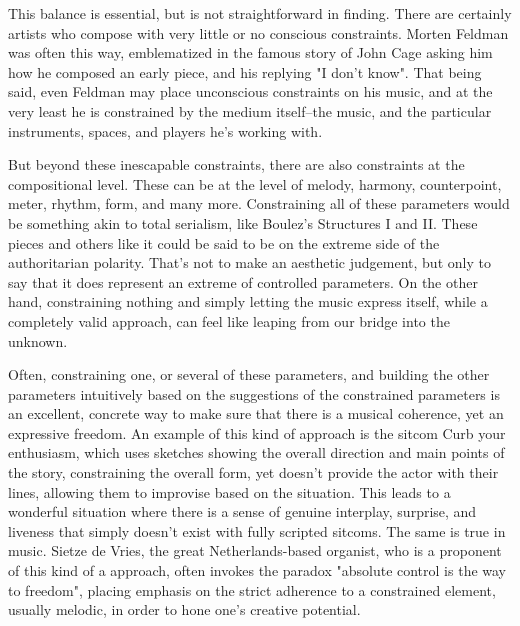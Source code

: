 \documentclass[12pt,twoside,maitrise]{dms}
\theoremstyle{definition}
\begin{document}
This balance is essential, but is not straightforward in finding.
There are certainly artists who compose with very little or no conscious constraints.
Morten Feldman was often this way, emblematized in the famous story of John Cage asking him how he composed an early piece, and his replying "I don't know".
That being said, even Feldman may place unconscious constraints on his music, and at the very least he is constrained by the medium itself--the music, and the particular instruments, spaces, and players he's working with.

But beyond these inescapable constraints, there are also constraints at the compositional level.
These can be at the level of melody, harmony, counterpoint, meter, rhythm, form, and many more.
Constraining all of these parameters would be something akin to total serialism, like Boulez's Structures I and II.
These pieces and others like it could be said to be on the extreme side of the authoritarian polarity.
That's not to make an aesthetic judgement, but only to say that it does represent an extreme of controlled parameters.
On the other hand, constraining nothing and simply letting the music express itself, while a completely valid approach, can feel like leaping from our bridge into the unknown.

Often, constraining one, or several of these parameters, and building the other parameters intuitively based on the suggestions of the constrained parameters is an excellent, concrete way to make sure that there is a musical coherence, yet an expressive freedom.
An example of this kind of approach is the sitcom Curb your enthusiasm, which uses sketches showing the overall direction and main points of the story, constraining the overall form, yet doesn't provide the actor with their lines, allowing them to improvise based on the situation.
This leads to a wonderful situation where there is a sense of genuine interplay, surprise, and liveness that simply doesn't exist with fully scripted sitcoms.
The same is true in music.
Sietze de Vries, the great Netherlands-based organist, who is a proponent of this kind of a approach, often invokes the paradox "absolute control is the way to freedom", placing emphasis on the strict adherence to a constrained element, usually melodic, in order to hone one's creative potential.
\end{document}
